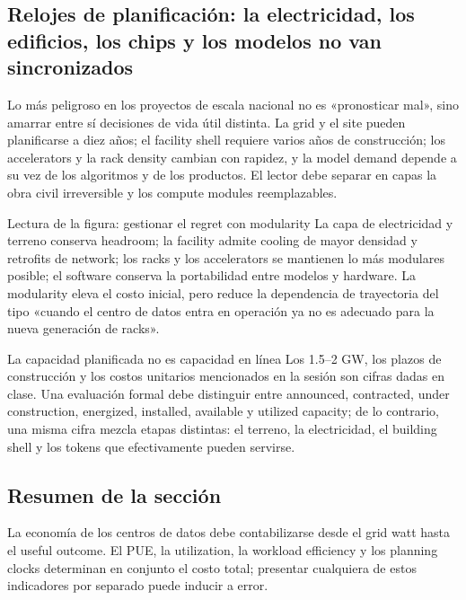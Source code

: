 \subsection{Relojes de planificación: la electricidad, los edificios, los chips y los modelos no van sincronizados}

Lo más peligroso en los proyectos de escala nacional no es «pronosticar mal», sino amarrar entre sí decisiones de vida útil distinta. La grid y el site pueden planificarse a diez años; el facility shell requiere varios años de construcción; los accelerators y la rack density cambian con rapidez, y la model demand depende a su vez de los algoritmos y de los productos. El lector debe separar en capas la obra civil irreversible y los compute modules reemplazables.


\begin{knowledgebox}{Lectura de la figura: gestionar el regret con modularity}
La capa de electricidad y terreno conserva headroom; la facility admite cooling de mayor densidad y retrofits de network; los racks y los accelerators se mantienen lo más modulares posible; el software conserva la portabilidad entre modelos y hardware. La modularity eleva el costo inicial, pero reduce la dependencia de trayectoria del tipo «cuando el centro de datos entra en operación ya no es adecuado para la nueva generación de racks».
\end{knowledgebox}

\begin{warningbox}{La capacidad planificada no es capacidad en línea}
Los 1.5--2 GW, los plazos de construcción y los costos unitarios mencionados en la sesión son cifras dadas en clase. Una evaluación formal debe distinguir entre announced, contracted, under construction, energized, installed, available y utilized capacity; de lo contrario, una misma cifra mezcla etapas distintas: el terreno, la electricidad, el building shell y los tokens que efectivamente pueden servirse.
\end{warningbox}


\subsection{Resumen de la sección}

La economía de los centros de datos debe contabilizarse desde el grid watt hasta el useful outcome. El PUE, la utilization, la workload efficiency y los planning clocks determinan en conjunto el costo total; presentar cualquiera de estos indicadores por separado puede inducir a error.
